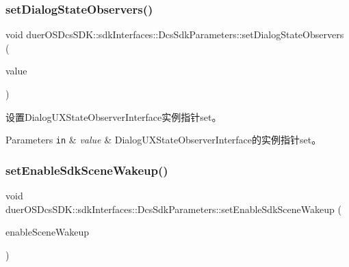 \subsubsection{\texorpdfstring{set\+Dialog\+State\+Observers()}{setDialogStateObservers()}}
{\footnotesize\ttfamily void duer\+O\+S\+Dcs\+S\+D\+K\+::sdk\+Interfaces\+::\+Dcs\+Sdk\+Parameters\+::set\+Dialog\+State\+Observers (\begin{DoxyParamCaption}\item[{std\+::unordered\+\_\+set$<$ std\+::shared\+\_\+ptr$<$ \hyperlink{classduerOSDcsSDK_1_1sdkInterfaces_1_1DialogUXStateObserverInterface}{Dialog\+U\+X\+State\+Observer\+Interface} $>$$>$}]{value }\end{DoxyParamCaption})\hspace{0.3cm}{\ttfamily [inline]}}



设置\+Dialog\+U\+X\+State\+Observer\+Interface实例指针set。 


\begin{DoxyParams}[1]{Parameters}
\mbox{\tt in}  & {\em value} & Dialog\+U\+X\+State\+Observer\+Interface的实例指针set。 \\
\hline
\end{DoxyParams}
\mbox{\label{structduerOSDcsSDK_1_1sdkInterfaces_1_1DcsSdkParameters_ab2820f06c3b47e1cd791e5216c1e8cff}} 
\subsubsection{\texorpdfstring{set\+Enable\+Sdk\+Scene\+Wakeup()}{setEnableSdkSceneWakeup()}}
{\footnotesize\ttfamily void duer\+O\+S\+Dcs\+S\+D\+K\+::sdk\+Interfaces\+::\+Dcs\+Sdk\+Parameters\+::set\+Enable\+Sdk\+Scene\+Wakeup (\begin{DoxyParamCaption}\item[{const bool}]{enable\+Scene\+Wakeup }\end{DoxyParamCaption})\hspace{0.3cm}{\ttfamily [inline]}}



